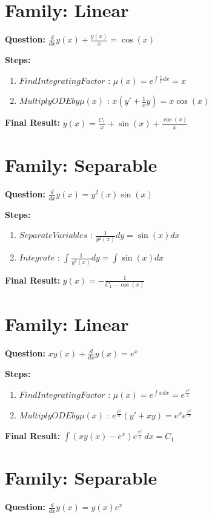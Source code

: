 \documentclass{article}
\begin{document}
\section*{Family: Linear}
\textbf{Question:} $\frac{d}{d x} y{\left(x \right)} + \frac{y{\left(x \right)}}{x} = \cos{\left(x \right)}$

\textbf{Steps:}
\begin{enumerate}
\item $Find Integrating Factor$ :  $\mu(x) = e^{\int \frac{1}{x} dx} = x$
\item $Multiply ODE by \mu(x)$ :  $x(y' + \frac{1}{x}y) = x \cos{\left(x \right)}$
\end{enumerate}
\textbf{Final Result:} $y{\left(x \right)} = \frac{C_{1}}{x} + \sin{\left(x \right)} + \frac{\cos{\left(x \right)}}{x}$

\section*{Family: Separable}
\textbf{Question:} $\frac{d}{d x} y{\left(x \right)} = y^{2}{\left(x \right)} \sin{\left(x \right)}$

\textbf{Steps:}
\begin{enumerate}
\item $Separate Variables$ :  $\frac{1}{y^{2}{\left(x \right)}} dy = \sin{\left(x \right)} dx$
\item $Integrate$ :  $\int \frac{1}{y^{2}{\left(x \right)}} dy = \int \sin{\left(x \right)} dx$
\end{enumerate}
\textbf{Final Result:} $y{\left(x \right)} = - \frac{1}{C_{1} - \cos{\left(x \right)}}$

\section*{Family: Linear}
\textbf{Question:} $x y{\left(x \right)} + \frac{d}{d x} y{\left(x \right)} = e^{x}$

\textbf{Steps:}
\begin{enumerate}
\item $Find Integrating Factor$ :  $\mu(x) = e^{\int x dx} = e^{\frac{x^{2}}{2}}$
\item $Multiply ODE by \mu(x)$ :  $e^{\frac{x^{2}}{2}}(y' + xy) = e^{x} e^{\frac{x^{2}}{2}}$
\end{enumerate}
\textbf{Final Result:} $\int \left(x y{\left(x \right)} - e^{x}\right) e^{\frac{x^{2}}{2}}\, dx = C_{1}$

\section*{Family: Separable}
\textbf{Question:} $\frac{d}{d x} y{\left(x \right)} = y{\left(x \right)} e^{x}$
\end{document}
